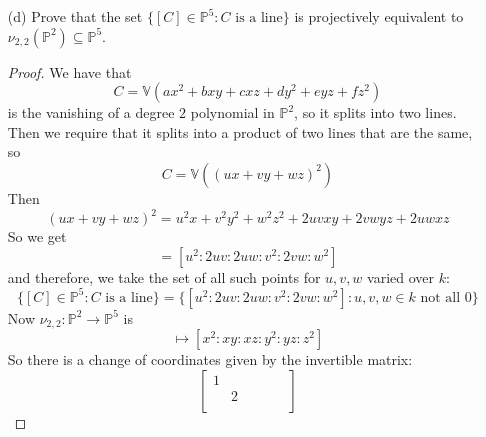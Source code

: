 \documentclass{article}
\begin{document}
\begin{itemize}
        \item [(d)] Prove that the set $\{[C] \in \mathbb{P}^{5} : C \text{ is a line}\}$ is projectively equivalent to $\nu_{2, 2}(\mathbb{P}^{2}) \subseteq \mathbb{P}^{5}$. 
            \begin{proof}
                We have that 
                    \begin{equation*}
                        C = \mathbb{V}(ax^{2} + bxy + cxz + dy^{2} + eyz + fz^{2})
                    \end{equation*}
                is the vanishing of a degree $2$ polynomial in $\mathbb{P}^{2}$, so it splits into two lines. Then we require that it splits into a product of two lines that are the same, so
                    \begin{equation*}
                        C = \mathbb{V}((ux + vy + wz)^{2})
                    \end{equation*}
                Then
                    \begin{equation*}
                        (ux + vy + wz)^{2} = u^{2}x + v^{2}y^{2} + w^{2}z^{2} + 2uvxy + 2vwyz + 2uwxz
                    \end{equation*}
                So we get 
                    \begin{equation*}
                        [a : b : c : d : e : f] = [u^{2} : 2uv : 2uw : v^{2} : 2vw : w^{2}]
                    \end{equation*}
                and therefore, we take the set of all such points for $u, v, w$ varied over $k$:
                    \begin{equation*}
                        \{[C] \in\mathbb{P}^{5} : C \text{ is a line}\} =  \{[u^{2} : 2uv : 2uw : v^{2} : 2vw : w^{2}] : u, v, w \in k \text{ not all $0$}\}
                    \end{equation*}
                Now $\nu_{2, 2} : \mathbb{P}^{2} \rightarrow\mathbb{P}^{5}$ is
                    \begin{equation*}
                        [x : y : z] \mapsto[x^{2} : xy : xz : y^{2} : yz : z^{2}]
                    \end{equation*}
                So there is a change of coordinates given by the invertible matrix:
                    \begin{equation*}
                        \begin{bmatrix}
                            1 &   &   &   &   &   \\
                              & 2 &   &   &   &   \\

\end{bmatrix}
\end{equation*}
\end{proof}
\end{itemize}
\end{document}
